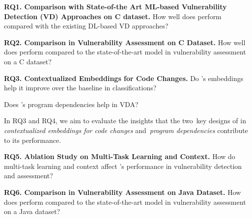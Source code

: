

\vspace{1pt}
\noindent\textbf{RQ1. Comparison with State-of-the Art ML-based Vulnerability
Detection (VD) Approaches on C dataset.} How well does {\tool} perform
compared with the existing DL-based VD approaches?

\vspace{1pt}
\noindent\textbf{RQ2. Comparison in Vulnerability Assessment on C
  Dataset.} How well does {\tool} perform compared to the
state-of-the-art model in vulnerability assessment on a C dataset?


\noindent\textbf{RQ3. Contextualized Embeddings for Code Changes.} Do {\tool}'s embeddings help it improve over the
baseline in classifications?


 Does {\tool}'s program dependencies help in VDA?

In RQ3 and RQ4, we aim to evaluate the insights that the two~key
  designs of {\tool} in {\em contextualized embeddings for code
  changes} and~{\em program dependencies} contribute to its performance.


\noindent\textbf{RQ5. Ablation Study on Multi-Task Learning and Context.} How do multi-task
learning and context affect {\tool}'s performance in vulnerability
detection and assessment?

\vspace{1pt}
\noindent\textbf{RQ6. Comparison in Vulnerability Assessment on Java
  Dataset.} How does {\tool} perform compared to the
state-of-the-art model in vulnerability assessment on a Java dataset?
